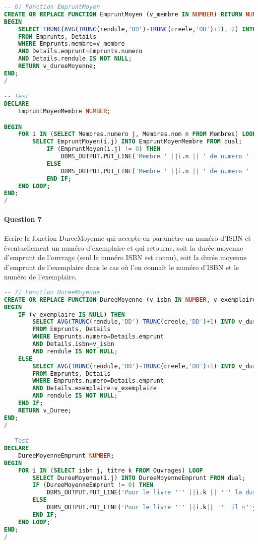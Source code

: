 \documentclass[10pt, oneside]{article}
\begin{document}
\begin{lstlisting}[language=sql, title=Question 6, label=QV6]
-- 6) Fonction EmpruntMoyen
CREATE OR REPLACE FUNCTION EmpruntMoyen (v_membre IN NUMBER) RETURN NUMBER IS v_dureeMoyenne NUMBER;
BEGIN 
	SELECT TRUNC(AVG(TRUNC(rendule,'DD')-TRUNC(creele,'DD')+1), 2) INTO v_dureeMoyenne
	FROM Emprunts, Details
	WHERE Emprunts.membre=v_membre
	AND Details.emprunt=Emprunts.numero
	AND Details.rendule IS NOT NULL;
	RETURN v_dureeMoyenne;
END;
/

-- Test
DECLARE
	EmpruntMoyenMembre NUMBER;

BEGIN
	FOR i IN (SELECT Membres.numero j, Membres.nom n FROM Membres) LOOP
		SELECT EmpruntMoyen(i.j) INTO EmpruntMoyenMembre FROM dual;
			IF (EmpruntMoyen(i.j) != 0) THEN
				DBMS_OUTPUT.PUT_LINE('Membre ' ||i.n || ' de numero ' ||i.j||' : Moyenne en jour de duree d''emprunts : ' ||EmpruntMoyenMembre);
			ELSE
				DBMS_OUTPUT.PUT_LINE('Membre ' ||i.n || ' de numero ' ||i.j||' : N''a jamais emprunte.');
			END IF;
	END LOOP;
END;
/
\end{lstlisting}


\paragraph{Question 7} Ecrire la fonction DureeMoyenne qui accepte en paramètre un numéro d'ISBN et éventuellement un numéro d'exemplaire et qui retourne, soit la durée moyenne d'emprunt de l'ouvrage (seul le numéro ISBN est connu), soit la durée moyenne d'emprunt de l'exemplaire dans le cas où l'on connaît le numéro d'ISBN et le numéro de l'exemplaire.

\begin{lstlisting}[language=sql, title=Question 7, label=QV7]
-- 7) Fonction DureeMoyenne
CREATE OR REPLACE FUNCTION DureeMoyenne (v_isbn IN NUMBER, v_exemplaire IN NUMBER DEFAULT NULL) RETURN NUMBER IS v_duree NUMBER;
BEGIN
	IF (v_exemplaire IS NULL) THEN
		SELECT AVG(TRUNC(rendule,'DD')-TRUNC(creele,'DD')+1) INTO v_duree
		FROM Emprunts, Details
		WHERE Emprunts.numero=Details.emprunt
		AND Details.isbn=v_isbn
		AND rendule IS NOT NULL;
	ELSE
		SELECT AVG(TRUNC(rendule,'DD')-TRUNC(creele,'DD')+1) INTO v_duree
		FROM Emprunts, Details
		WHERE Emprunts.numero=Details.emprunt
		AND Details.exemplaire=v_exemplaire
		AND rendule IS NOT NULL;
	END IF;
	RETURN v_Duree;
END;
/

-- Test
DECLARE
	DureeMoyenneEmprunt NUMBER;
BEGIN
	FOR i IN (SELECT isbn j, titre k FROM Ouvrages) LOOP
		SELECT DureeMoyenne(i.j) INTO DureeMoyenneEmprunt FROM dual;
		IF (DureeMoyenneEmprunt != 0) THEN
			DBMS_OUTPUT.PUT_LINE('Pour le livre ''' ||i.k || ''' la duree moyenne d''emprunt est : ' ||DureeMoyenneEmprunt);
		ELSE
			DBMS_OUTPUT.PUT_LINE('Pour le livre ''' ||i.k|| ''' il n''y a pas de duree moyenne d''emprunts.');
		END IF;
	END LOOP;
END;
/
\end{lstlisting}
\end{document}

